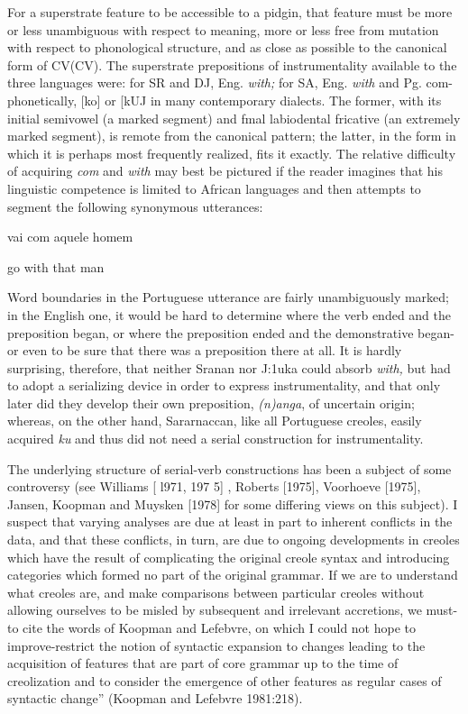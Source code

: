 For a superstrate feature to be accessible to a pidgin, that feature must be more or less unambiguous with respect to meaning, more or less free from mutation with respect to phonological structure, and as close as possible to the canonical form of CV(CV). The superstrate prepositions of instrumentality available to the three languages were: for SR and DJ, Eng. \textit{with;} for SA, Eng. \textit{with} and Pg. com-phonetically, [ko] or [kUJ in many contemporary dialects. The former, with its initial semivowel (a marked segment) and fmal labiodental fricative (an extremely marked segment), is remote from the canonical pattern; the latter, in the form in which it is perhaps most frequently realized, fits it exactly. The relative difficulty of acquiring \textit{com} and \textit{with} may best be pictured if the reader imagines that his linguistic competence
is limited to African languages and then attempts to segment the following synonymous utterances:

\ea\label{ex:2:234}
 vai com aquele homem
\z

\ea\label{ex:2:235}
 go with that man
\z

Word boundaries in the Portuguese utterance are fairly un\-ambiguously marked; in the English one, it would be hard to determine where the verb ended and the preposition began, or where the preposi\-tion ended and the demonstrative began-or even to be sure that there was a preposition there at all. It is hardly surprising, therefore, that neither Sranan nor J:1uka could absorb \textit{with,} but had to adopt a serializ\-ing device in order to express instrumentality, and that only later did they develop their own preposition, \textit{(n)anga}, of uncertain origin;
whereas, on the other hand, Sararnaccan, like all Portuguese creoles, easily acquired \textit{ku} and thus did not need a serial construction for instrumentality.

The underlying structure of serial-verb constructions has been a subject of some controversy (see Williams [ l971, 197 5] , Roberts [1975], Voorhoeve [1975], Jansen, Koopman and Muysken [1978] for some differing views on this subject). I suspect that varying analyses are due at least in part to inherent conflicts in the data, and that these conflicts, in turn, are due to ongoing developments in creoles which have the result of complicating the original creole syntax and intro\-ducing categories which formed no part of the original grammar. If we are to understand what creoles are, and make comparisons between particular creoles without allowing ourselves to be misled by sub\-sequent and irrelevant accretions, we must-to cite the words of Koop\-man and Lefebvre, on which I could not hope to improve{}-{\textquotedbl}restrict the notion of syntactic expansion to changes leading to the acquisition of features that are part of core grammar up to the time of creolization and to consider the emergence of other features as regular cases of syntactic change'' (Koopman and Lefebvre 1981:218).

